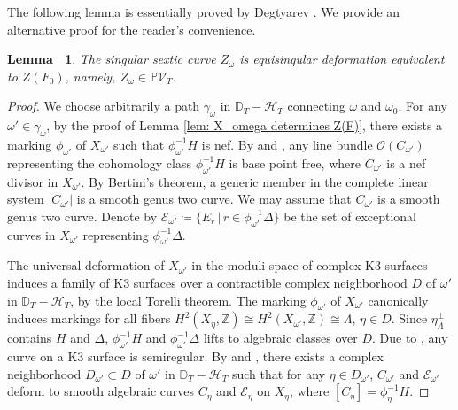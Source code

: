 \documentclass[12pt,reqno,a4paper]{amsart}
\newtheorem{lem}[thm]{Lemma~}
\theoremstyle{remark}
\theoremstyle{definition}
\newcommand{\ZZ}{\mathbb{Z}}
\newcommand{\PP}{\mathbb{P}}
\newcommand{\DD}{\mathbb{D}}
\newcommand{\calH}{\mathcal{H}}
\newcommand{\calV}{\mathcal{V}}
\newcommand{\calO}{\mathcal{O}}
\newcommand{\calE}{\mathcal{E}}
\begin{document}
The following lemma is essentially proved by Degtyarev \cite[Theorem 3.4.1]{degtyarev2008deformations}. We provide an alternative proof for the reader's convenience.
\begin{lem}
\label{lem: Z_omega has type T}
    The singular sextic curve $Z_\omega$ is equisingular deformation equivalent to $Z(F_0)$, namely, $Z_\omega\in \PP\calV_T$.
\end{lem}
\begin{proof}
    We choose arbitrarily a path $\gamma_\omega$ in $\DD_T-\calH_T$ connecting $\omega$ and $\omega_0$.
    For any $\omega'\in\gamma_\omega$, by the proof of Lemma \ref{lem: X_omega determines Z(F)}, there exists a marking $\phi_{\omega'}$ of $X_{\omega'}$ such that $\phi_{\omega'}^{-1} H$ is nef.
    By \cite[Proposition 1.7]{urabe1988combinations} and \cite[Chapter 2, \S 3, Corollary 3.14]{huybrechts2016lectures}, any line bundle $\calO(C_{\omega'})$ representing the cohomology class $\phi_{\omega'}^{-1} H$ is base point free, where $C_{\omega'}$ is a nef divisor in $X_{\omega'}$.
    By Bertini's theorem, a generic member in the complete linear system $|C_{\omega'}|$ is a smooth genus two curve.
    We may assume that $C_{\omega'}$ is a smooth genus two curve.
    Denote by $\calE_{\omega'}\coloneqq\{E_r \,|\, r\in \phi_{\omega'}^{-1} \Delta\}$ be the set of exceptional curves in $X_{\omega'}$ representing $\phi_{\omega'}^{-1} \Delta$.

    The universal deformation of $X_{\omega'}$ in the moduli space of complex K3 surfaces induces a family of K3 surfaces over a contractible complex neighborhood $D$ of $\omega'$ in $\DD_T-\calH_T$, by the local Torelli theorem.
    The marking $\phi_{\omega'}$ of $X_{\omega'}$ canonically induces markings for all fibers $H^2(X_\eta,\ZZ)\cong H^2(X_{\omega'},\ZZ)\cong\Lambda$, $\eta\in D$.
    Since $\eta^\perp_\Lambda$ contains $H$ and $\Delta$, $\phi_{\omega'}^{-1} H$ and $\phi_{\omega'}^{-1} \Delta$ lifts to algebraic classes over $D$.
    Due to \cite[Page 363]{nishinou2024deformation}, any curve on a K3 surface is semiregular.
    By \cite[Theorem 7.1]{bloch1972semi-regularity} and \cite[Theorem 1.5(i)]{artin1968solutions}, there exists a complex neighborhood $D_{\omega'}\subset D$ of $\omega'$ in $\DD_T-\calH_T$ such that for any $\eta\in D_{\omega'}$, $C_{\omega'}$ and $\calE_{\omega'}$ deform to smooth algebraic curves $C_{\eta}$ and $\calE_{\eta}$ on $X_\eta$, where $[C_{\eta}]=\phi_\eta^{-1} H$.


\end{proof}
\end{document}
